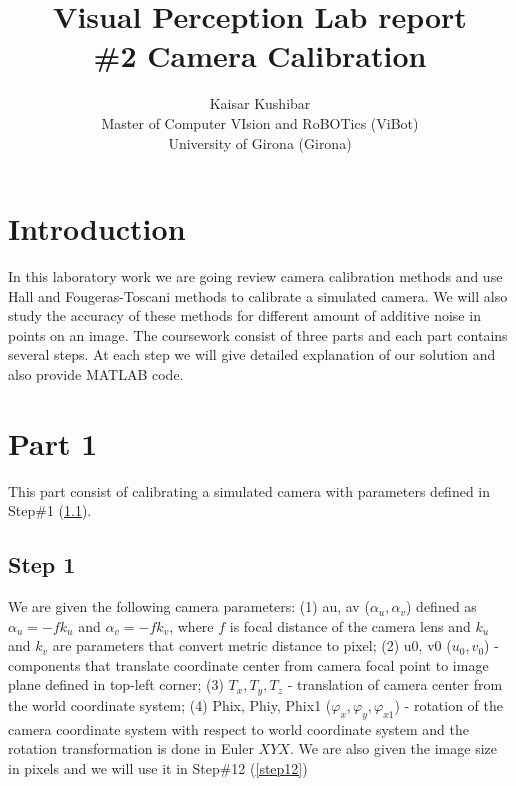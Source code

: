 \documentclass[a4paper, 10pt]{article}
\begin{document}
\title{Visual Perception Lab report \\ \#2 Camera Calibration}
\author{Kaisar Kushibar\\
Master of Computer VIsion and RoBOTics (ViBot)\\University of Girona (Girona)}

\maketitle
\section*{Introduction}
In this laboratory work we are going review camera calibration methods and use Hall and Fougeras-Toscani methods to calibrate a simulated camera. We will also study the accuracy of these methods for different amount of additive noise in points on an image. The coursework consist of three parts and each part contains several steps. At each step we will give detailed explanation of our solution and also provide MATLAB code.
\section{Part 1}
This part consist of calibrating a simulated camera with parameters defined in Step\#1 (\ref{step1}).
\subsection{Step 1}\label{step1}
We are given the following camera parameters: (1) au, av ($\alpha_u, \alpha_v$) defined as $\alpha_u=-fk_u$ and $\alpha_v=-fk_v$, where $f$ is focal distance of the camera lens and $k_u$ and $k_v$ are parameters that convert metric distance to pixel; (2) u0, v0 ($u_0, v_0$) - components that translate coordinate center from camera focal point to image plane defined in top-left corner; (3) $T_x, T_y, T_z$ - translation of camera center from the world coordinate system; (4) Phix, Phiy, Phix1 ($\varphi_x, \varphi_y, \varphi_{x1}$) - rotation of the camera coordinate system with respect to world coordinate system and the rotation transformation is done in Euler $XYX$. We are also given the image size in pixels and we will use it in Step\#12 (\ref{step12})
\end{document}
